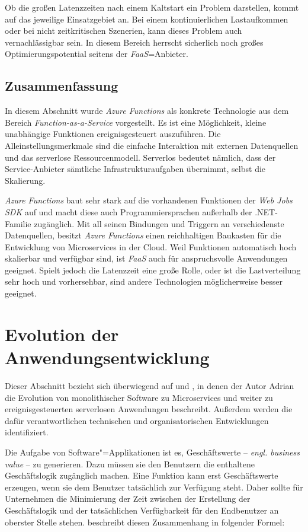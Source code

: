 Ob die großen Latenzzeiten nach einem Kaltstart ein Problem darstellen, kommt auf das jeweilige Einsatzgebiet an. Bei einem kontinuierlichen Lastaufkommen oder bei nicht zeitkritischen Szenerien, kann dieses Problem auch vernachlässigbar sein. In diesem Bereich herrscht sicherlich noch großes Optimierungspotential seitens der \textit{FaaS}=Anbieter.

\subsection{Zusammenfassung}

In diesem Abschnitt wurde \textit{Azure Functions} als konkrete Technologie aus dem Bereich \textit{Function-as-a-Service} vorgestellt. Es ist eine Möglichkeit, kleine unabhängige Funktionen ereignisgesteuert auszuführen. Die Alleinstellungsmerkmale sind die einfache Interaktion mit externen Datenquellen und das serverlose Ressourcenmodell. Serverlos bedeutet nämlich, dass der Service-Anbieter sämtliche Infrastrukturaufgaben übernimmt, selbst die Skalierung.

\textit{Azure Functions} baut sehr stark auf die vorhandenen Funktionen der \textit{Web Jobs SDK} auf und macht diese auch Programmiersprachen außerhalb der .NET-Familie zugänglich. Mit all seinen Bindungen und Triggern an verschiedenste Datenquellen, besitzt \textit{Azure Functions} einen reichhaltigen Baukasten für die Entwicklung von Microservices in der Cloud. Weil Funktionen automatisch hoch skalierbar und verfügbar sind, ist \textit{FaaS} auch für anspruchsvolle Anwendungen geeignet. Spielt jedoch die Latenzzeit eine große Rolle, oder ist die Lastverteilung sehr hoch und vorhersehbar, sind andere Technologien möglicherweise besser geeignet. 

\section{Evolution der Anwendungsentwicklung}

Dieser Abschnitt bezieht sich überwiegend auf \cite{Cock16EvoFunc} und \cite{Cock17ShrinkingMS}, in denen der Autor Adrian \citeauthor{Cock16EvoFunc} die Evolution von monolithischer Software zu Microservices und weiter zu ereignisgesteuerten serverlosen Anwendungen beschreibt. Außerdem werden die dafür verantwortlichen technischen und organisatorischen Entwicklungen identifiziert.

Die Aufgabe von Software"=Applikationen ist es, Geschäftswerte -- \textit{engl. business value} -- zu generieren. Dazu müssen sie den Benutzern die enthaltene Geschäftslogik zugänglich machen. Eine Funktion kann erst Geschäftswerte erzeugen, wenn sie dem Benutzer tatsächlich zur Verfügung steht. Daher sollte für Unternehmen die Minimierung der Zeit zwischen der Erstellung der Geschäftslogik und der tatsächlichen Verfügbarkeit für den Endbenutzer an oberster Stelle stehen. \citeauthor{Cock16EvoFunc} beschreibt diesen Zusammenhang in folgender Formel:


